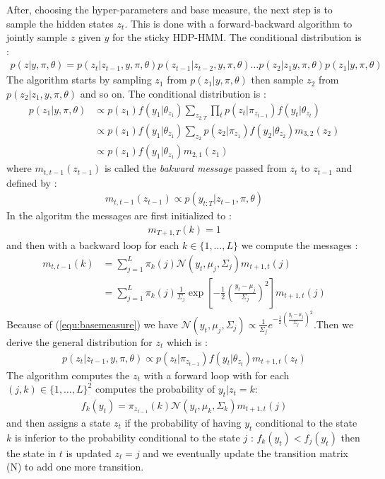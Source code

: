 After, choosing the hyper-parameters and base measure, the next step is to sample the hidden states $z_t$. This is done with a forward-backward algorithm to jointly sample $z$ given $y$ for the sticky HDP-HMM. The conditional distribution is : 
\begin{align*}
	p(z|y, \pi, \theta) = p(z_t|z_{t-1}, y, \pi, \theta) p(z_{t-1}|z_{t-2}, y, \pi, \theta) \dots p(z_2|z_1 y, \pi, \theta) p(z_1| y, \pi, \theta) 
\end{align*} 
The algorithm starts by sampling $z_1$ from $ p(z_1| y, \pi, \theta)$ then sample $z_2$ from $ p(z_2|z_1, y, \pi, \theta)$ and so on. The conditional distribution is :\begin{align*}
	 p(z_1| y, \pi, \theta) &\propto p(z_1)f(y_1|\theta_{z_1})\sum_{z_{2:T}} \prod_t p(z_t|\pi_{z_{t-1}})f(y_t|\theta_{z_t})\\&\propto  p(z_1)f(y_1|\theta_{z_1}) \sum_{z_2}p(z_2|\pi_{z_1})f(y_2|\theta_{z_2})m_{3,2}(z_2)
	 \\ &\propto  p(z_1)f(y_1|\theta_{z_1})m_{2,1}(z_1)
\end{align*}
where $m_{t,t-1}(z_{t-1})$ is called the \textit{bakward message} passed from $z_t$ to $z_{t-1}$ and defined by : 
\begin{align*}
	m_{t,t-1}(z_{t-1}) \propto p(y_{t:T}|z_{t-1},\pi,\theta)
\end{align*}
In the algoritm the messages are first initialized to :\begin{align*}
	m_{T+1,T}(k)=1
\end{align*}
and then with a backward loop for each $k\in \{1,\dots, L\}$ we compute the messages : \begin{align*}
	m_{t,t-1}(k)&=\sum^L_{j=1}\pi_k(j) \mathcal N(y_t, \mu_j, \Sigma_j)m_{t+1, t}(j)\\
	&=\sum^L_{j=1}\pi_k(j) \frac{1}{\Sigma_j}\exp\left[ -\frac{1}{2} \left( \frac{y_t-\mu_j}{\Sigma_j}\right)^2\right]m_{t+1, t}(j)
\end{align*}
Because of (\ref{equ:basemeasure}) we have $\mathcal N(y_t, \mu_j, \Sigma_j)\propto \frac{1}{\Sigma_j} e^{-\frac{1}{2} \left( \frac{y_t-\mu_j}{\Sigma_j}\right)^2}$.Then we derive the general distribution for $z_t$ which is : 
\begin{align*}
	p(z_t|z_{t-1}, y, \pi,\theta) \propto p(z_t|\pi_{z_{t-1}})f(y_t|\theta_{z_t})m_{t+1,t}(z_t)
\end{align*}
The algorithm computes the $z_t$ with a forward loop  with for each $(j,k)\in \{1,\dots, L\}^2$ computes the probability of $y_t|z_t=k$:
\begin{align*}
	f_k(y_t)=\pi_{z_{t-1}}(k)\mathcal N (y_t,\mu_k,\Sigma_k)m_{t+1,t}(j)
\end{align*}
and then assigns a state $z_t$ if the probability of having $y_t$ conditional to the state $k$ is inferior to the probability conditional to the state $j$  : $f_k(y_t)<f_j(y_t)$ then the state in $t$ is updated $z_t=j$ and we eventually update the transition matrix (N) to add one more transition. 	

